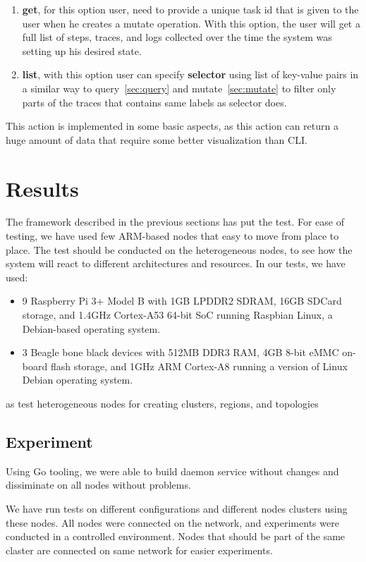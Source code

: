 \begin{enumerate}[start=1,label={(\bfseries \arabic*)}]
	\item \textbf{get}, for this option user, need to provide a unique task id that is given to the user when he creates a mutate operation. With this option, the user will get a full list of steps, traces, and logs collected over the time the system was setting up his desired state.  
	\item \textbf{list}, with this option user can specify \textbf{selector} using list of key-value pairs in a similar way to query~\ref{sec:query} and mutate~\ref{sec:mutate} to filter only parts of the traces that contains same labels as selector does.
\end{enumerate}

\noindent
This action is implemented in some basic aspects, as this action can return a huge amount of data that require some better visualization than CLI.
%
%
\section{Results}\label{sec:results}
% 
The framework described in the previous sections has put the test. For ease of testing, we have used few ARM-based nodes that easy to move from place to place. The test should be conducted on the heterogeneous nodes, to see how the system will react to different architectures and resources. In our tests, we have used:

\begin{itemize}
	\item 9 Raspberry Pi 3+ Model B with 1GB LPDDR2 SDRAM, 16GB SDCard storage, and 1.4GHz Cortex-A53 64-bit SoC running Raspbian Linux, a Debian-based operating system.
	\item 3 Beagle bone black devices with 512MB DDR3 RAM, 4GB 8-bit eMMC on-board flash storage, and 1GHz ARM Cortex-A8 running a version of Linux Debian operating system.
\end{itemize}

\noindent
as test heterogeneous nodes for creating clusters, regions, and topologies
%
%
\subsection{Experiment}\label{sec:experiment}
%
Using Go tooling, we were able to build daemon service without changes and dissiminate on all nodes without problems.

We have run tests on different configurations and different nodes clusters using these nodes. All nodes were connected on the network, and experiments were conducted in a controlled environment. Nodes that should be part of the same claster are connected on same network for easier experiments.

